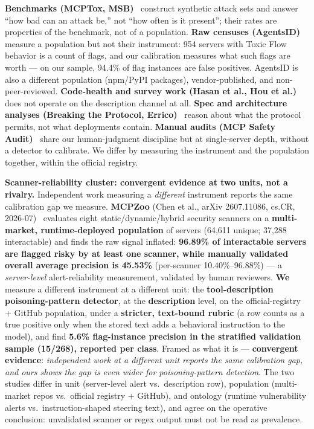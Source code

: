 \documentclass[10pt,conference]{IEEEtran}
\begin{document}
\textbf{Benchmarks (MCPTox, MSB)}~\cite{mcptox,msb} construct synthetic attack sets and
answer ``how bad can an attack be,'' not ``how often is it present''; their rates are
properties of the benchmark, not of a population. \textbf{Raw censuses (AgentsID)}
~\cite{agentsid} measure a population but not their instrument: 954 servers with Toxic Flow
behavior is a count of flags, and our calibration measures what such flags are worth --- on
our sample, 94.4\% of flag instances are false positives. AgentsID is also a different
population (npm/PyPI packages), vendor-published, and non-peer-reviewed.
\textbf{Code-health and survey work (Hasan et al., Hou et al.)}~\cite{hasan,hou} does not
operate on the description channel at all. \textbf{Spec and architecture analyses
(Breaking the Protocol, Errico)}~\cite{protocol,errico} reason about what the protocol
permits, not what deployments contain. \textbf{Manual audits (MCP Safety
Audit)}~\cite{audit} share our human-judgment discipline but at single-server depth,
without a detector to calibrate. We differ by measuring the instrument and the population
together, within the official registry.

\textbf{Scanner-reliability cluster: convergent evidence at two units, not a rivalry.}
Independent work measuring a \emph{different} instrument reports the same calibration gap we
measure. \textbf{MCPZoo} (Chen et al., arXiv 2607.11086, cs.CR, 2026-07)~\cite{mcpzoo}
evaluates eight static/dynamic/hybrid security scanners on a \textbf{multi-market,
runtime-deployed population} of servers (64,611 unique; 37,288 interactable) and finds the
raw signal inflated: \textbf{96.89\% of interactable servers are flagged risky by at least
one scanner, while manually validated overall average precision is 45.53\%}
(per-scanner 10.40\%--96.88\%) --- a \emph{server-level} alert-reliability measurement,
validated by human reviewers. \textbf{We} measure a different instrument at a different
unit: the \textbf{tool-description poisoning-pattern detector}, at the \textbf{description}
level, on the official-registry + GitHub population, under a \textbf{stricter, text-bound
rubric} (a row counts as a true positive only when the stored text adds a behavioral
instruction to the model), and find \textbf{5.6\% flag-instance precision in the
stratified validation sample (15/268), reported per class}. Framed as what it is ---
\textbf{convergent evidence}: \emph{independent work at a
different unit reports the same calibration gap, and ours shows the gap is even wider for
poisoning-pattern detection}. The two studies differ in unit (server-level alert vs.\
description row), population (multi-market repos vs.\ official registry + GitHub), and
ontology (runtime vulnerability alerts vs.\ instruction-shaped steering text), and agree on
the operative conclusion: unvalidated scanner or regex output must not be read as
prevalence.
\end{document}
